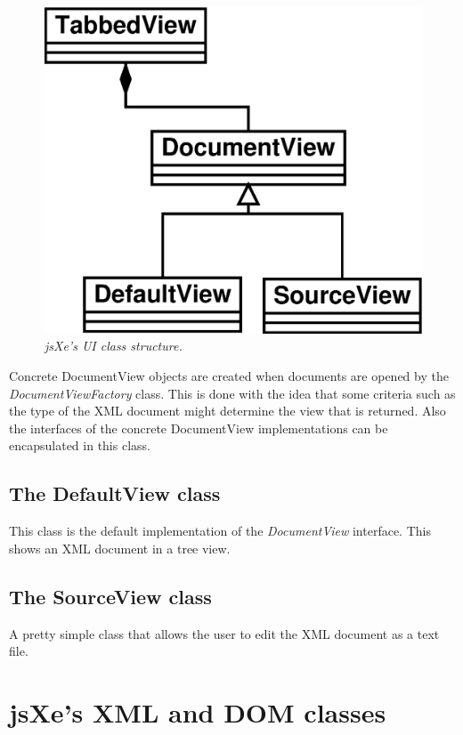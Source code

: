 \documentclass[12pt]{article}
\begin{document}
\begin{figure}[h]
  \includegraphics{uistructure.eps}
  \caption{\label{structure1}\emph{jsXe's UI class structure.}}
\end{figure}

Concrete DocumentView objects are created when documents are opened by
the \emph{DocumentViewFactory} class. This is done with the idea that some
criteria such as the type of the XML document might determine the view that is
returned. Also the interfaces of the concrete DocumentView
implementations can be encapsulated in this class.

\subsection{The DefaultView class}
This class is the default implementation of the \emph{DocumentView} interface. This
shows an XML document in a tree view.

\subsection{The SourceView class}
A pretty simple class that allows the user to edit the XML document as a text
file.

\section{jsXe's XML and DOM classes}
\end{document}
